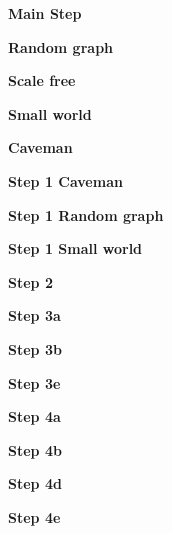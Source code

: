 \textbf{Main Step}



\textbf{Random graph}

\textbf{Scale free}

\textbf{Small world}

\textbf{Caveman}

\textbf{Step 1 Caveman}

\textbf{Step 1 Random graph}

\textbf{Step 1 Small world}

\textbf{Step 2}

\textbf{Step 3a}

\textbf{Step 3b}

\textbf{Step 3e}

\textbf{Step 4a}

\textbf{Step 4b}

\textbf{Step 4d}

\textbf{Step 4e}

